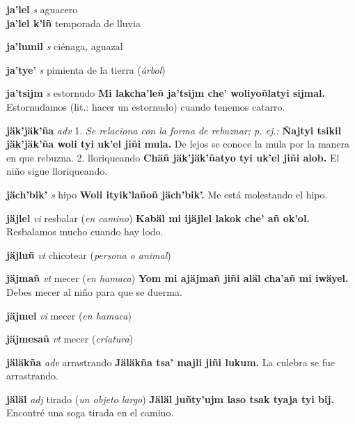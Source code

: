 \documentclass[10pt]{scrbook}
\newcommand{\entry}[1]{\textbf{#1}}
\newcommand{\onedefinition}[1]{#1.}
\newcommand{\nontranslationdef}[1]{\textit{#1}}
\newcommand{\partofspeech}[1]{\textit{#1}}
\newcommand{\spanishtranslation}[1]{#1}
\newcommand{\clarification}[1]{(\textit{#1})}
\newcommand{\cholexample}[1]{\textbf{#1}}
\newcommand{\exampletranslation}[1]{#1}
\newcommand{\secondaryentry}[1]{\\\textbf{#1}}
\newcommand{\secondtranslation}[1]{#1}
\begin{document}
\begin{multicols}{2}
\entry{ja'lel}
\partofspeech{s}
\spanishtranslation{aguacero}
\secondaryentry{ja'lel k'iñ}
\secondtranslation{temporada de lluvia}

\entry{ja'lumil}
\partofspeech{s}
\spanishtranslation{ciénaga, aguazal}

\entry{ja'tye'}
\partofspeech{s}
\spanishtranslation{pimienta de la tierra}
\clarification{árbol}

\entry{ja'tsijm}
\partofspeech{s}
\spanishtranslation{estornudo}
\cholexample{Mi lakcha'leñ ja'tsijm che' woliyoñlatyi sijmal.}
\exampletranslation{Estornudamos (lit.: hacer un estornudo) cuando tenemos catarro.}

\entry{jäk'jäk'ña}
\partofspeech{adv}
\onedefinition{1}
\nontranslationdef{Se relaciona con la forma de rebuznar; p. ej.:}
\cholexample{Ñajtyi tsikil jäk'jäk'ña woli tyi uk'el jiñi mula.}
\exampletranslation{De lejos se conoce la mula por la manera en que rebuzna.}
\onedefinition{2}
\spanishtranslation{lloriqueando}
\cholexample{Chäñ jäk'jäk'ñatyo tyi uk'el jiñi alob.}
\exampletranslation{El niño sigue lloriqueando.}

\entry{jäch'bik'}
\partofspeech{s}
\spanishtranslation{hipo}
\cholexample{Woli ityik'lañoñ jäch'bik'.}
\exampletranslation{Me está molestando el hipo.}

\entry{jäjlel}
\partofspeech{vi}
\spanishtranslation{resbalar}
\clarification{en camino}
\cholexample{Kabäl mi ijäjlel lakok che' añ ok'ol.}
\exampletranslation{Resbalamos mucho cuando hay lodo.}

\entry{jäjluñ}
\partofspeech{vt}
\spanishtranslation{chicotear}
\clarification{persona o animal}

\entry{jäjmañ}
\partofspeech{vt}
\spanishtranslation{mecer}
\clarification{en hamaca}
\cholexample{Yom mi ajäjmañ jiñi aläl cha'añ mi iwäyel.}
\exampletranslation{Debes mecer al niño para que se duerma.}

\entry{jäjmel}
\partofspeech{vi}
\spanishtranslation{mecer}
\clarification{en hamaca}

\entry{jäjmesañ}
\partofspeech{vt}
\spanishtranslation{mecer}
\clarification{criatura}

\entry{jäläkña}
\partofspeech{adv}
\spanishtranslation{arrastrando}
\cholexample{Jäläkña tsa' majli jiñi lukum.}
\exampletranslation{La culebra se fue arrastrando.}

\entry{jäläl}
\partofspeech{adj}
\spanishtranslation{tirado}
\clarification{un objeto largo}
\cholexample{Jäläl juñty'ujm laso tsak tyaja tyi bij.}
\exampletranslation{Encontré una soga tirada en el camino.}


\end{multicols}
\end{document}
